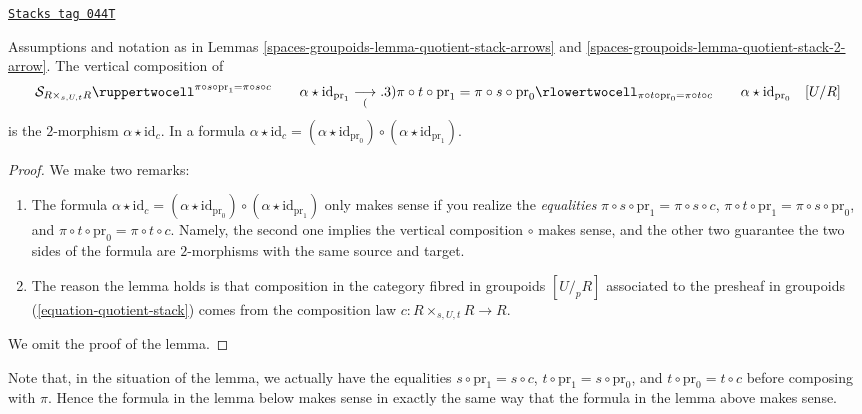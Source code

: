 \begin{lemma}
\label{spaces-groupoids-lemma-quotient-stack-cocycle}
\href{https://stacks.math.columbia.edu/tag/044T}{\texttt{Stacks tag 044T}}

Assumptions and notation as in
Lemmas \ref{spaces-groupoids-lemma-quotient-stack-arrows} and
\ref{spaces-groupoids-lemma-quotient-stack-2-arrow}.
The vertical composition of
$$
\begin{array}{cc}\mathcal{S}_{R \times_{s, U, t} R}
\ruppertwocell^{\pi \circ s \circ \text{pr}_1 = \pi \circ s \circ c}{\ \ \ \ \ \ \alpha \star \text{id}_{\text{pr}_1}}
\underset{(}{\longrightarrow}.3){\pi \circ t \circ \text{pr}_1 = \pi \circ s \circ \text{pr}_0}
\rlowertwocell_{\pi \circ t \circ \text{pr}_0 = \pi \circ t \circ c}{\ \ \ \ \ \ \alpha \star \text{id}_{\text{pr}_0}} & [U/R]\end{array}
$$
is the $2$-morphism $\alpha \star \text{id}_c$. In a formula
$\alpha \star \text{id}_c =
(\alpha \star \text{id}_{\text{pr}_0})
\circ
(\alpha \star \text{id}_{\text{pr}_1})
$.
\end{lemma}

\begin{proof}
We make two remarks:
\begin{enumerate}
\item The formula
$\alpha \star \text{id}_c = (\alpha \star \text{id}_{\text{pr}_0}) \circ
(\alpha \star \text{id}_{\text{pr}_1})$ only makes sense if you realize
the {\it equalities} $\pi \circ s \circ \text{pr}_1 = \pi \circ s \circ c$,
$\pi \circ t \circ \text{pr}_1 = \pi \circ s \circ \text{pr}_0$, and
$\pi \circ t \circ \text{pr}_0 = \pi \circ t \circ c$. Namely, the second
one implies the vertical composition $\circ$ makes sense, and the other
two guarantee the two sides of the formula are $2$-morphisms with the
same source and target.
\item The reason the lemma holds is that composition in the
category fibred in groupoids $[U/_{\!p}R]$ associated to the presheaf
in groupoids (\ref{equation-quotient-stack}) comes from the composition
law $c : R \times_{s, U, t} R \to R$.
\end{enumerate}
We omit the proof of the lemma.
\end{proof}

Note that, in the situation of the lemma, we actually have the equalities
$s \circ \text{pr}_1 = s \circ c$,
$t \circ \text{pr}_1 = s \circ \text{pr}_0$, and
$t \circ \text{pr}_0 = t \circ c$ before composing with $\pi$.
Hence the formula in the lemma below makes sense in exactly the same way
that the formula in the lemma above makes sense.

